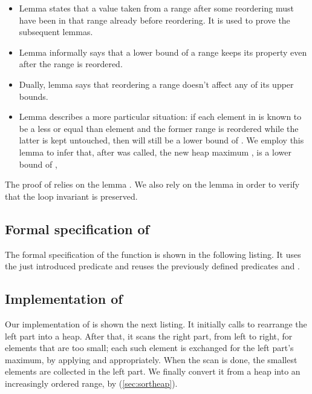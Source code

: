 \begin{itemize}
\item
Lemma \MultisetReorderSomeEqual states that a value
 taken from a range  after some reordering
must have been in that range already before reordering.
It is used to prove the subsequent lemmas.

\item
Lemma \MultisetReorderLowerBound
informally says that a lower bound  of a
range  keeps its property even after the range is
reordered.

\item
Dually, lemma \MultisetReorderUpperBound says that reordering a range
doesn't affect any of its upper bounds.

\item
Lemma \MultisetReorderPartitionLowerBound 
describes a more particular
situation: if each element in 
is known to be a less or equal than element 
and the former range is reordered while the latter is kept untouched,
then  will still be a lower bound of .
We employ this lemma to infer that, after  was called, the new
heap maximum , is a lower bound of ,

\end{itemize}

The proof of  relies on the lemma .
We also rely on the lemma 
in order to verify that the loop invariant  is preserved.

\subsection{Formal specification of \partialsort}

The formal specification of the \partialsort function is shown in the following listing.
It uses the just introduced predicate \Partition and reuses the
previously defined predicates  and .



\subsection{Implementation of \partialsort}

Our implementation of \partialsort is shown the next listing.
%
It initially calls  to rearrange the left part  into a heap.
%
After that, it scans the right part, from left to right, for elements
that are too small;
each such element is exchanged for the left part's maximum, by applying
  and   appropriately.
%
When the scan is done, the smallest elements are collected in the left
part.
%
We finally convert it from a heap into an increasingly ordered range,
by \sortheap (\ref{sec:sortheap}).


